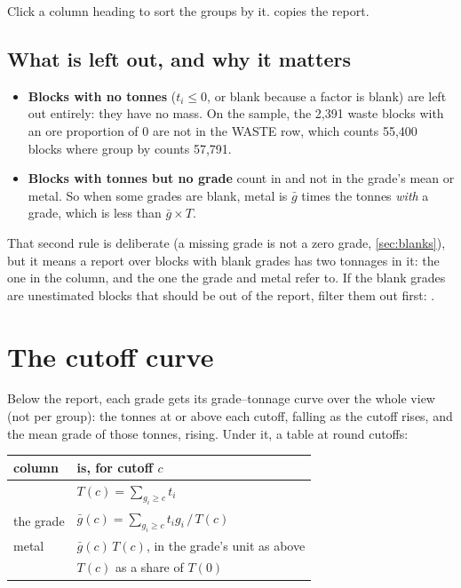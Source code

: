 
Click a column heading to sort the groups by it.  copies the report.

\subsection{What is left out, and why it matters}\label{sec:gt-left-out}

\begin{itemize}
\item \textbf{Blocks with no tonnes} ($t_i \le 0$, or blank because a factor is blank) are left out
entirely: they have no mass. On the sample, the 2{,}391 waste blocks with an ore proportion of 0 are not
in the WASTE row, which counts 55{,}400 blocks where group by counts 57{,}791.
\item \textbf{Blocks with tonnes but no grade} count in  and not in the grade's mean or metal.
So when some grades are blank, metal is $\bar{g}$ times the tonnes \emph{with} a grade, which is less
than $\bar{g} \times T$.
\end{itemize}

\begin{caution}
That second rule is deliberate (a missing grade is not a zero grade, \cref{sec:blanks}), but it means a
report over blocks with blank grades has two tonnages in it: the one in the  column, and the
one the grade and metal refer to. If the blank grades are unestimated blocks that should be out of the
report, filter them out first: .
\end{caution}

\section{The cutoff curve}\label{sec:gt-curve}

Below the report, each grade gets its grade–tonnage curve over the whole view (not per group): the
tonnes at or above each cutoff, falling as the cutoff rises, and the mean grade of those tonnes, rising.
Under it, a table at round cutoffs:

\begin{center}\small
\begin{tabularx}{\linewidth}{@{}lL@{}}
\toprule
\sffamily\bfseries column & \sffamily\bfseries is, for cutoff $c$ \\
\midrule
{} & $T(c) = \sum_{g_i \ge c} t_i$ \\
the grade & $\bar{g}(c) = \sum_{g_i \ge c} t_i g_i \,/\, T(c)$ \\
metal & $\bar{g}(c)\,T(c)$, in the grade's unit as above \\
 & $T(c)$ as a share of $T(0)$ \\
\bottomrule
\end{tabularx}
\end{center}

